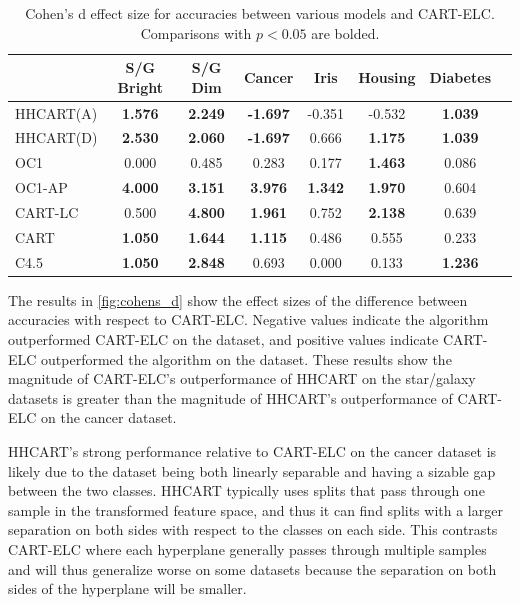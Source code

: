 \documentclass[10pt]{article} %
\begin{document}
\begin{table}[h]
	\centering
	\caption{Cohen's d effect size for accuracies between various models and CART-ELC. Comparisons with $p < 0.05$ are bolded.}
		\small
	\begin{tabular}{lccccccc} 
		\addlinespace
		\toprule
		\multirow{1}{*}{Algorithm} & \multirow{1}{*}{S/G Bright} & \multirow{1}{*}{S/G Dim} & \multirow{1}{*}{Cancer} & \multirow{1}{*}{Iris} & \multirow{1}{*}{Housing} & \multirow{1}{*}{Diabetes} \\ 
		\midrule

		HHCART(A) & \textbf{1.576} & \textbf{2.249} & \textbf{-1.697} & -0.351 & -0.532 & \textbf{1.039} \\
		HHCART(D) & \textbf{2.530} & \textbf{2.060} & \textbf{-1.697} & 0.666 & \textbf{1.175} & \textbf{1.039} \\
	OC1 & 0.000 & 0.485 & 0.283 & 0.177 & \textbf{1.463} & 0.086 \\
	OC1-AP & \textbf{4.000} & \textbf{3.151} & \textbf{3.976} & \textbf{1.342} & \textbf{1.970} & 0.604 \\
	CART-LC & 0.500 & \textbf{4.800} & \textbf{1.961} & 0.752 & \textbf{2.138} & 0.639 \\
	CART & \textbf{1.050} & \textbf{1.644} & \textbf{1.115} & 0.486 & 0.555 & 0.233 \\
	C4.5 & \textbf{1.050} & \textbf{2.848} & 0.693 & 0.000 & 0.133 & \textbf{1.236} \\
    \bottomrule
\end{tabular}
\label{fig:cohens_d}
\end{table}


The results in \autoref{fig:cohens_d} show the effect sizes of the difference between accuracies with respect to CART-ELC. Negative values indicate the algorithm outperformed CART-ELC on the dataset, and positive values indicate CART-ELC outperformed the algorithm on the dataset. These results show the magnitude of CART-ELC's outperformance of HHCART on the star/galaxy datasets is greater than the magnitude of HHCART's outperformance of CART-ELC on the cancer dataset. 

HHCART's strong performance relative to CART-ELC on the cancer dataset is likely due to the dataset being both linearly separable and having a sizable gap between the two classes. HHCART typically uses splits that pass through one sample in the transformed feature space, and thus it can find splits with a larger separation on both sides with respect to the classes on each side. This contrasts CART-ELC where each hyperplane generally passes through multiple samples and will thus generalize worse on some datasets because the separation on both sides of the hyperplane will be smaller.
\end{document}
